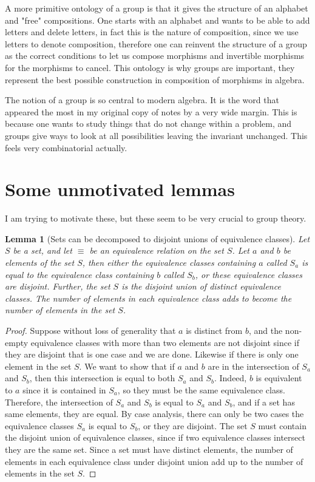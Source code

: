 \documentclass{tufte-book}
\newtheorem{lemma}[theorem]{Lemma}
\begin{document}
A more primitive ontology of a group is that it gives the structure of an alphabet and "free" compositions. One starts with an alphabet and wants to be able to add letters and delete letters, in fact this is the nature of composition, since we use letters to denote composition, therefore one can reinvent the structure of a group as the correct conditions to let us compose morphisms and invertible morphisms for the morphisms to cancel. This ontology is why groups are important, they represent the best possible construction in composition of morphisms in algebra.

The notion of a group is so central to modern algebra. It is the word that appeared the most in my original copy of notes by a very wide margin. This is because one wants to study things that do not change within a problem, and groups give ways to look at all possibilities leaving the invariant unchanged. This feels very combinatorial actually.

\section{Some unmotivated lemmas}

I am trying to motivate these, but these seem to be very crucial to group theory.

\begin{lemma}[Sets can be decomposed to disjoint unions of equivalence classes]
  \label{set-equiv-class-decomp}
  Let $S$ be a set, and let $\equiv$ be an equivalence relation on the set $S$.
  Let $a$ and $b$ be elements of the set $S$, then either 
  the equivalence classes containing $a$ called $S_{a}$ is equal to the 
  equivalence class containing $b$ called $S_{b}$, or these equivalence classes are disjoint.
  Further, the set $S$ is the disjoint union of distinct equivalence classes.
  The number of elements in each equivalence class adds to become the number of elements in the set $S$.
\end{lemma}

\begin{proof}
  Suppose without loss of generality that $a$ is distinct from $b$, and the non-empty equivalence classes
  with more than two elements are not disjoint since if they are disjoint that is one case and we are done.
  Likewise if there is only one element in the set $S$.
  We want to show that if $a$ and $b$ are in the intersection of $S_{a}$ and $S_{b}$, then this intersection is equal to
  both $S_a$ and $S_b$. Indeed, $b$ is equivalent to $a$ since it is contained in $S_a$, so they must be the same equivalence class.
  Therefore, the intersection of $S_{a}$ and $S_{b}$ is equal to $S_a$ and $S_b$, and if a set has same elements, they are equal.
  By case analysis, there can only be two cases the equivalence classes $S_a$ is equal to $S_b$, or they are disjoint.
  The set $S$ must contain the disjoint union of equivalence classes, since if two equivalence classes intersect they are the same set.
  Since a set must have distinct elements, the number of elements in each equivalence class under disjoint union add up to the number of elements in the set $S$.
\end{proof}
\end{document}
